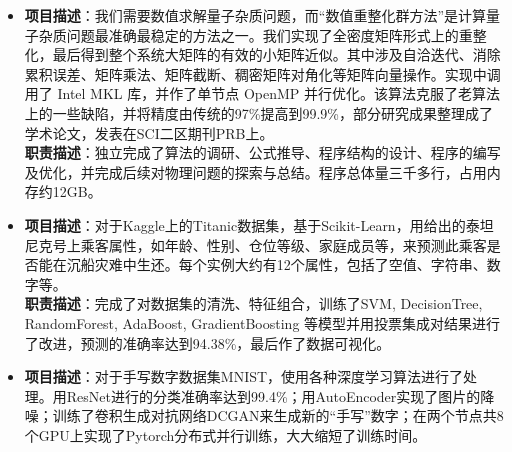 \documentclass{resume}
\begin{document}
\begin{itemize}
\item {}
{\textbf{项目描述}：我们需要数值求解量子杂质问题，而“数值重整化群方法”是计算量子杂质问题最准确最稳定的方法之一。我们实现了全密度矩阵形式上的重整化，最后得到整个系统大矩阵的有效的小矩阵近似。其中涉及自洽迭代、消除累积误差、矩阵乘法、矩阵截断、稠密矩阵对⻆化等矩阵向量操作。实现中调用了 Intel MKL 库，并作了单节点 OpenMP 并行优化。该算法克服了老算法上的一些缺陷，并将精度由传统的97\%提高到99.9\%，部分研究成果整理成了学术论文，发表在SCI二区期刊PRB上。}\\
\textbf{职责描述}：独立完成了算法的调研、公式推导、程序结构的设计、程序的编写及优化，并完成后续对物理问题的探索与总结。程序总体量三千多行，占用内存约12GB。
\item {}
\textbf{项目描述}：对于Kaggle上的Titanic数据集，基于Scikit-Learn，用给出的泰坦尼克号上乘客属性，如年龄、性别、仓位等级、家庭成员等，来预测此乘客是否能在沉船灾难中生还。每个实例大约有12个属性，包括了空值、字符串、数字等。\\
\textbf{职责描述}：完成了对数据集的清洗、特征组合，训练了SVM, DecisionTree, RandomForest, AdaBoost, GradientBoosting 等模型并用投票集成对结果进行了改进，预测的准确率达到94.38\%，最后作了数据可视化。
\item {}
\textbf{项目描述}：对于手写数字数据集MNIST，使用各种深度学习算法进行了处理。用ResNet进行的分类准确率达到99.4\%；用AutoEncoder实现了图片的降噪；训练了卷积生成对抗网络DCGAN来生成新的“手写”数字；在两个节点共8个GPU上实现了Pytorch分布式并行训练，大大缩短了训练时间。\\
\end{itemize}
\end{document}
